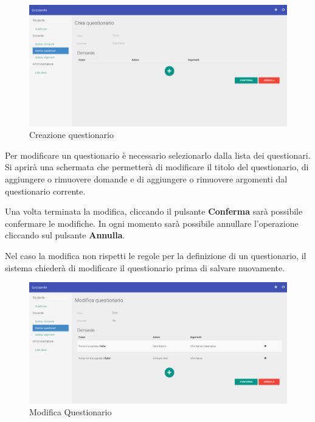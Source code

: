 \documentclass[12pt,a4paper]{article}
\begin{document}
		\begin{figure}[H]	
			\centering
			\includegraphics[width=1.0\linewidth]{../img/screenshot/creazioneQuestionario.png}
			\caption{Creazione questionario}
			\label{Creazione questionario}
		\end{figure}
		
		\par Per modificare un questionario è necessario selezionarlo dalla lista dei questionari. Si aprirà una schermata che permetterà di modificare il titolo del questionario, di aggiungere o rimuovere domande e di aggiungere o rimuovere argomenti dal questionario corrente. \\
		\par Una volta terminata la modifica, cliccando il pulsante \textbf{Conferma} sarà possibile confermare le modifiche. In ogni momento sarà possibile annullare l'operazione cliccando sul pulsante \textbf{Annulla}. \\
			
		\par Nel caso la modifica non rispetti le regole per la definizione di un questionario, il sistema chiederà di modificare il questionario prima di salvare nuovamente. \\
		
		\begin{figure}[H]	
			\centering
			\includegraphics[width=1.0\linewidth]{../img/screenshot/modificaQuestionario.png}
			\caption{Modifica Questionario}
			\label{Modifica Questionario}
		\end{figure}
			
\end{document}
